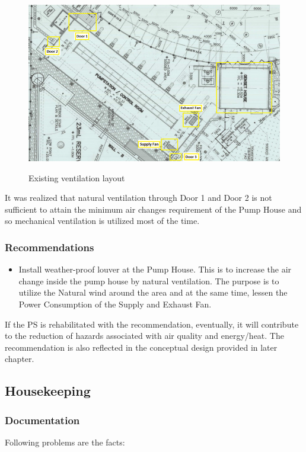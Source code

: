 \begin{figure}[h]
	\includegraphics[scale=2]{figures/ch04_fig_ventilation01} \\
	\caption{Existing ventilation layout}
	\label{ch04_fig_ventilation01} 
\end{figure}

It was realized that natural ventilation through Door 1 and Door 2 is not sufficient to attain the minimum air changes requirement of the Pump House and so mechanical ventilation is utilized most of the time.


\subsubsection{Recommendations}

\begin{itemize}
\item Install weather-proof louver at the Pump House. This is to increase the air change inside the pump house by natural ventilation. The purpose is to utilize the Natural wind around the area and at the same time, lessen the Power Consumption of the Supply and Exhaust Fan. 
\end{itemize}

If the PS is rehabilitated with the recommendation, eventually, it will contribute to the reduction of hazards associated with air quality and energy/heat. The recommendation is also reflected in the conceptual design provided in later chapter.


\subsection{Housekeeping}\label{aq05}
\subsubsection{Documentation}
Following problems are the facts:

